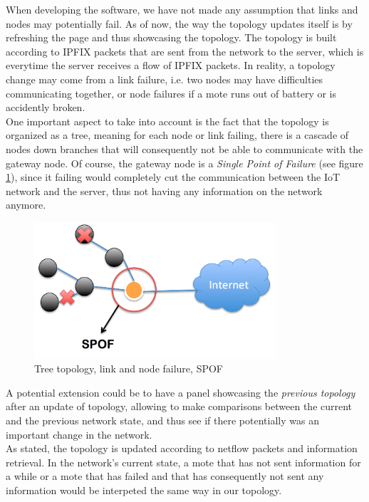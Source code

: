 When developing the software, we have not made any assumption that links and nodes may potentially fail. As of now, the way the topology updates itself is by refreshing the page and thus showcasing the topology. The topology is built according to IPFIX packets that are sent from the network to the server, which is everytime the server receives a flow of IPFIX packets. In reality, a topology change may come from a link failure, i.e. two nodes may have difficulties communicating together, or node failures if a mote runs out of battery or is accidently broken. \\

One important aspect to take into account is the fact that the topology is organized as a tree, meaning for each node or link failing, there is a cascade of nodes down branches that will consequently not be able to communicate with the gateway node. Of course, the gateway node is a \textit{Single Point of Failure} (see figure \ref{fig:spof}), since it failing would completely cut the communication between the IoT network and the server, thus not having any information on the network anymore.\\

\begin{figure}[!h]
	\centering
	\includegraphics[width=0.8\textwidth]{res/spof.png}
	\caption{Tree topology, link and node failure, SPOF}
	\label{fig:spof}
\end{figure}

A potential extension could be to have a panel showcasing the \textit{previous topology} after an update of topology, allowing to make comparisons between the current and the previous network state, and thus see if there potentially was an important change in the network.\\

As stated, the topology is updated according to netflow packets and information retrieval. In the network's current state, a mote that has not sent information for a while or a mote that has failed and that has consequently not sent any information would be interpeted the same way in our topology. \\


